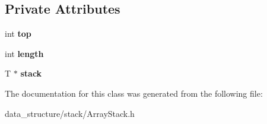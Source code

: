 \subsection*{Private Attributes}
\begin{DoxyCompactItemize}
\item 
\mbox{\label{classArrayStack_ae828e7a9c71bb3fddf0dd5630cc46565}} 
int {\bfseries top}
\item 
\mbox{\label{classArrayStack_a8a6aa843f59c9c06660b5b523835456a}} 
int {\bfseries length}
\item 
\mbox{\label{classArrayStack_a0014804227d2de0343475323939e1518}} 
T $\ast$ {\bfseries stack}
\end{DoxyCompactItemize}


The documentation for this class was generated from the following file\+:\begin{DoxyCompactItemize}
\item 
data\+\_\+structure/stack/Array\+Stack.\+h\end{DoxyCompactItemize}
